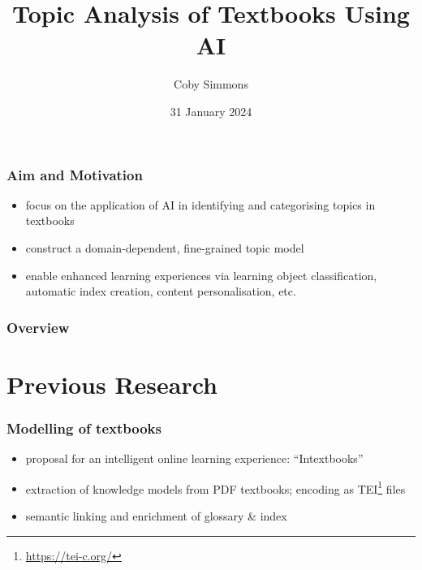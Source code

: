 \documentclass[aspectratio=169]{beamer}
\title{Topic Analysis of Textbooks Using AI}
\author{Coby Simmons}
\institute[Utrecht University]{
Utrecht University
\\ \medskip
\textit{cobysimmons01@gmail.com}
}
\date{31 January 2024}
\let\oldparencites\parencites
\renewcommand{\parencites}[1]{{\color{gray}\scriptsize \oldparencites{#1}}}
\begin{document}
\begin{frame}
\titlepage %
\end{frame}



\begin{frame} \frametitle{Aim and Motivation}

\begin{itemize}
    \item focus on the application of AI in identifying and categorising topics in textbooks \pause
    \item construct a domain-dependent, fine-grained topic model \pause
    \item enable enhanced learning experiences via learning object classification, automatic index creation, content personalisation, etc.
\end{itemize}

\end{frame}


\begin{frame} \frametitle{Overview}
\tableofcontents
\end{frame}


\section{Previous Research}

\begin{frame} \frametitle{Modelling of textbooks}

\begin{itemize}
    \item proposal for an intelligent online learning experience: ``Intextbooks'' \\ \parencites{alpizarchacon2020intextbooks}
    \item extraction of knowledge models from PDF textbooks; encoding as TEI\footnote{\url{https://tei-c.org/}} files \\ \parencites{alpizarchacon2020, alpizarchacon2021}
    \item semantic linking and enrichment of glossary \& index \\ \parencites{alpizarchacon2019, alpizarchacon2022}
\end{itemize}

\end{frame}
\end{document}
